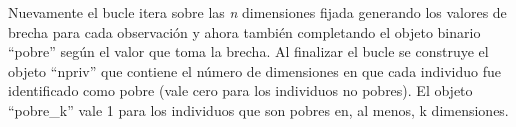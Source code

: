 \documentclass[
]{book}
\newenvironment{Shaded}{\begin{snugshade}}{\end{snugshade}}
\newcommand{\CommentTok}[1]{\textcolor[rgb]{0.56,0.35,0.01}{\textit{#1}}}
\newcommand{\DecValTok}[1]{\textcolor[rgb]{0.00,0.00,0.81}{#1}}
\newcommand{\FloatTok}[1]{\textcolor[rgb]{0.00,0.00,0.81}{#1}}
\newcommand{\FunctionTok}[1]{\textcolor[rgb]{0.00,0.00,0.00}{#1}}
\newcommand{\NormalTok}[1]{#1}
\newcommand{\OtherTok}[1]{\textcolor[rgb]{0.56,0.35,0.01}{#1}}
\newcommand{\SpecialCharTok}[1]{\textcolor[rgb]{0.00,0.00,0.00}{#1}}
\begin{document}
\begin{Shaded}
\end{Shaded}

Nuevamente el bucle itera sobre las \emph{n} dimensiones fijada generando los valores de brecha para cada observación y ahora también completando el objeto binario ``pobre'' según el valor que toma la brecha. Al finalizar el bucle se construye el objeto ``npriv'' que contiene el número de dimensiones en que cada individuo fue identificado como pobre (vale cero para los individuos no pobres). El objeto ``pobre\_k'' vale 1 para los individuos que son pobres en, al menos, k dimensiones.
\end{document}
